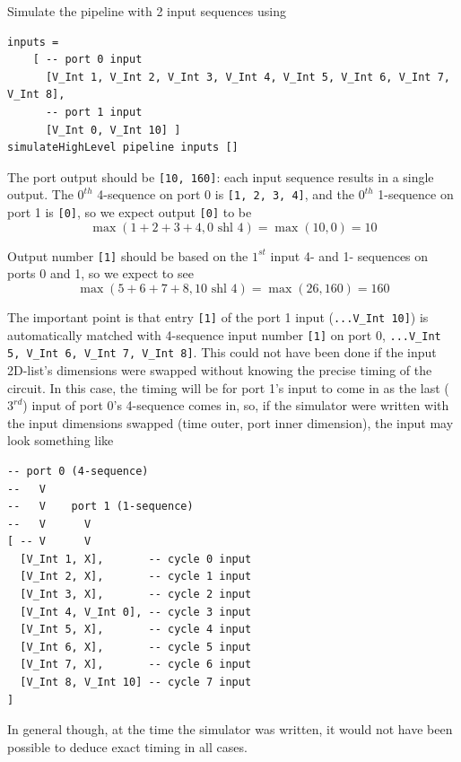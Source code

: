 \documentclass[12pt]{article}
\begin{document}
Simulate the pipeline with 2 input sequences using

\begin{verbatim}
inputs =
    [ -- port 0 input
      [V_Int 1, V_Int 2, V_Int 3, V_Int 4, V_Int 5, V_Int 6, V_Int 7, V_Int 8],
      -- port 1 input
      [V_Int 0, V_Int 10] ]
simulateHighLevel pipeline inputs []
\end{verbatim}

The port output should be \texttt{[10, 160]}: each input sequence
results in a single output. The $0^{th}$ 4-sequence on port 0 is
\texttt{[1, 2, 3, 4]}, and the $0^{th}$ 1-sequence on port 1 is
\texttt{[0]}, so we expect output \texttt{[0]} to be
\begin{equation}
    \max(1+2+3+4, 0 \text{ shl } 4) = \max(10, 0) = 10
\end{equation}

Output number \texttt{[1]} should be based on the $1^{st}$ input
4- and 1- sequences on ports 0 and 1, so we expect to see
\begin{equation}
    \max(5+6+7+8, 10 \text{ shl } 4) = \max(26, 160) = 160
\end{equation}

The important point is that entry \texttt{[1]} of the port 1 input
(\texttt{...V\_Int 10]}) is automatically matched with 4-sequence
input number \texttt{[1]} on port 0,
\texttt{...V\_Int 5, V\_Int 6, V\_Int 7, V\_Int 8]}. This could
not have been done if the input 2D-list's dimensions were swapped
without knowing the precise timing of the circuit. In this case,
the timing will be for port 1's input to come in as the last
($3^{rd}$) input of port 0's 4-sequence comes in, so, if the simulator
were written with the input dimensions swapped (time outer, port
inner dimension), the input may look something like

\begin{verbatim}
-- port 0 (4-sequence)
--   V
--   V    port 1 (1-sequence)
--   V      V
[ -- V      V
  [V_Int 1, X],       -- cycle 0 input
  [V_Int 2, X],       -- cycle 1 input
  [V_Int 3, X],       -- cycle 2 input
  [V_Int 4, V_Int 0], -- cycle 3 input
  [V_Int 5, X],       -- cycle 4 input
  [V_Int 6, X],       -- cycle 5 input
  [V_Int 7, X],       -- cycle 6 input
  [V_Int 8, V_Int 10] -- cycle 7 input
]
\end{verbatim}

In general though, at the time the simulator was written, it would not
have been possible to deduce exact timing in all cases.
\end{document}
